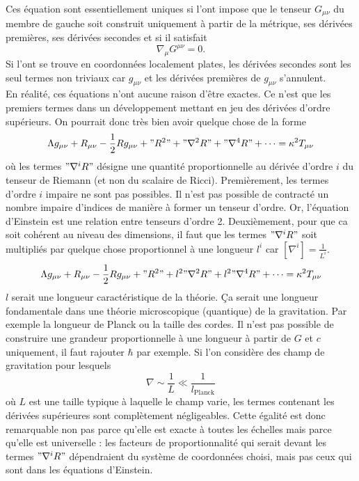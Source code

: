 \documentclass[a4paper,11pt]{report}
\theoremstyle{definition}
\theoremstyle{plain}
\theoremstyle{definition}
\theoremstyle{remark}
\begin{document}
            Ces équation sont essentiellement uniques si l'ont impose que le tenseur $G_{\mu\nu}$ du membre de gauche soit construit uniquement à partir de la métrique, ses dérivées premières, ses dérivées secondes et si il satisfait
            \begin{equation}
                \nabla_\mu G^{\mu\nu} = 0.
            \end{equation}
            Si l'ont se trouve en coordonnées localement plates, les dérivées secondes sont les seul termes non triviaux car $g_{\mu\nu}$ et les dérivées premières de $g_{\mu\nu}$ s'annulent.\\
            
            En réalité, ces équations n'ont aucune raison d'être exactes. Ce n'est que les premiers termes dans un développement mettant en jeu des dérivées d'ordre supérieurs. On pourrait donc très bien avoir quelque chose de la forme
            \begin{equation}
                \Lambda g_{\mu\nu} + R_{\mu\nu} - \frac{1}{2}Rg_{\mu\nu} + "R^2" + "\nabla^2R" + "\nabla^4 R"+\dots = \kappa^2 T_{\mu\nu}
            \end{equation}
            où les termes $"\nabla^iR"$ désigne une quantité proportionnelle au dérivée d'ordre $i$ du tenseur de Riemann (et non du scalaire de Ricci). Premièrement, les termes d'ordre $i$ impaire ne sont pas possibles. Il n'est pas possible de contracté un nombre impaire d'indices de manière à former un tenseur d'ordre. Or, l'équation d'Einstein est une relation entre tenseurs d'ordre 2. Deuxièmement, pour que ca soit cohérent au niveau des dimensions, il faut que les termes $"\nabla^i R"$ soit multipliés par quelque chose proportionnel à une longueur $l^i$ car $[\nabla^i]=\frac{1}{L^i}$.
            \begin{equation}
                \Lambda g_{\mu\nu} + R_{\mu\nu} - \frac{1}{2}Rg_{\mu\nu} + "R^2" + l^2"\nabla^2R" + l^2"\nabla^4 R"+\dots = \kappa^2 T_{\mu\nu}
            \end{equation}
            $l$ serait une longueur caractéristique de la théorie. Ça serait une longueur fondamentale dans une théorie microscopique (quantique) de la gravitation. Par exemple la longueur de Planck ou la taille des cordes. Il n'est pas possible de construire une grandeur proportionnelle à une longueur à partir de $G$ et $c$ uniquement, il faut rajouter $\hbar$ par exemple. Si l'on considère des champ de gravitation pour lesquels
            \begin{equation}
                \nabla\sim\frac{1}{L}\ll \frac{1}{l_{\text{Planck}}}
            \end{equation}
            où $L$ est une taille typique à laquelle le champ varie, les termes contenant les dérivées supérieures sont complètement négligeables. Cette égalité est donc remarquable non pas parce qu'elle est exacte à toutes les échelles mais parce qu'elle est universelle : les facteurs de proportionnalité qui serait devant les termes $"\nabla^iR"$ dépendraient du système de coordonnées choisi, mais pas ceux qui sont dans les équations d'Einstein.\\
            
\end{document}
